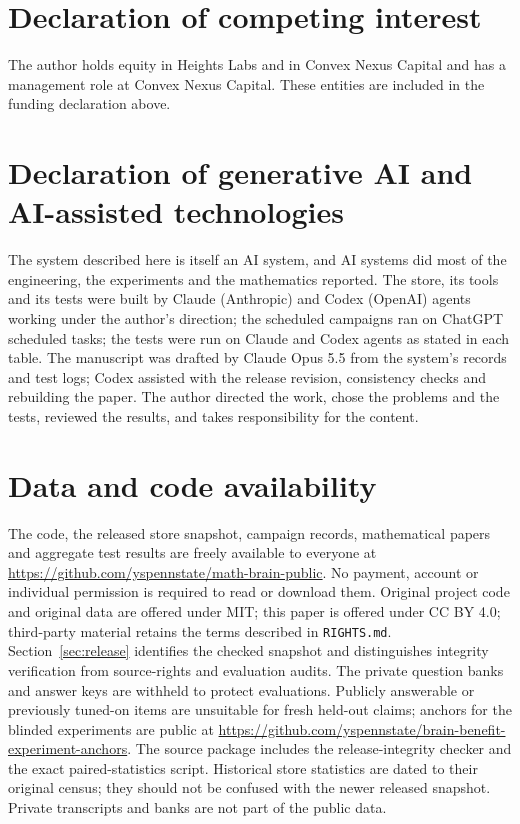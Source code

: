\documentclass[11pt,reqno]{amsart}
\theoremstyle{plain}
\theoremstyle{definition}
\theoremstyle{remark}
\begin{document}
\section*{Declaration of competing interest}
The author holds equity in Heights Labs and in Convex Nexus Capital and has a management role at Convex Nexus Capital. These entities are included in the funding declaration above.

\section*{Declaration of generative AI and AI-assisted technologies}
The system described here is itself an AI system, and AI systems did most of the engineering, the experiments and the mathematics reported. The store, its tools and its tests were built by Claude (Anthropic) and Codex (OpenAI) agents working under the author's direction; the scheduled campaigns ran on ChatGPT scheduled tasks; the tests were run on Claude and Codex agents as stated in each table. The manuscript was drafted by Claude Opus 5.5 from the system's records and test logs; Codex assisted with the release revision, consistency checks and rebuilding the paper. The author directed the work, chose the problems and the tests, reviewed the results, and takes responsibility for the content.

\section*{Data and code availability}
The code, the released store snapshot, campaign records, mathematical papers and aggregate test results are freely available to everyone at \url{https://github.com/yspennstate/math-brain-public}. No payment, account or individual permission is required to read or download them. Original project code and original data are offered under MIT; this paper is offered under CC BY 4.0; third-party material retains the terms described in \texttt{RIGHTS.md}. Section~\ref{sec:release} identifies the checked snapshot and distinguishes integrity verification from source-rights and evaluation audits. The private question banks and answer keys are withheld to protect evaluations. Publicly answerable or previously tuned-on items are unsuitable for fresh held-out claims; anchors for the blinded experiments are public at \url{https://github.com/yspennstate/brain-benefit-experiment-anchors}. The source package includes the release-integrity checker and the exact paired-statistics script. Historical store statistics are dated to their original census; they should not be confused with the newer released snapshot. Private transcripts and banks are not part of the public data.


\end{document}
